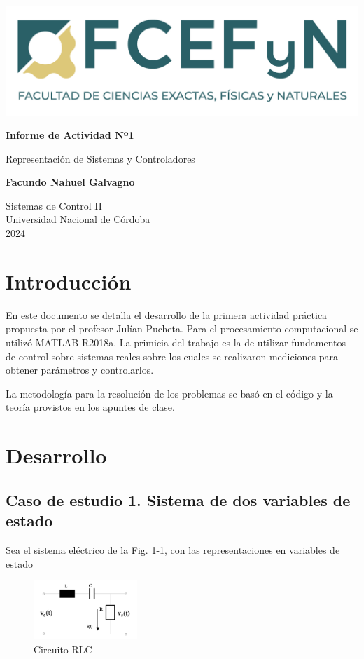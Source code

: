 \documentclass{article}
\renewcommand{\maketitle}{
    \begin{titlepage}
            \begin{center}
                \includegraphics[width=1\textwidth]{img/FCEFyN-Duotono_tagline.png}
            
            \vspace*{1cm}
                
            \Huge
            \textbf{Informe de Actividad Nº1}
                
            \vspace{0.5cm}
            \LARGE
            Representación de Sistemas y Controladores

                
            
                
            \vfill
                
            \textbf{Facundo Nahuel Galvagno}

            \vspace{0.8cm}
                
            
                
            \Large
            Sistemas de Control II\\
            Universidad Nacional de Córdoba \\
            2024
        \end{center}
                
    \end{titlepage}
}
\begin{document}

\maketitle

\tableofcontents
\newpage

\section{Introducción}
\label{section:1}
En este documento se detalla el desarrollo de la primera actividad
práctica propuesta por el profesor Julían Pucheta. Para el procesamiento 
computacional se utilizó MATLAB R2018a. La primicia del trabajo es la de utilizar fundamentos
de control sobre sistemas reales sobre los cuales se realizaron mediciones para obtener parámetros y
controlarlos.

La metodología para la resolución de los problemas se basó en el 
código y la teoría provistos en los apuntes de clase.

\section{Desarrollo}
\label{section:2}
\subsection{Caso de estudio 1. Sistema de dos variables de estado}
\label{subsection:1}
Sea el sistema eléctrico de la Fig. 1-1, con las representaciones en variables de estado

\begin{figure}[!h]
  \centering
  \includegraphics[width=0.35\textwidth]{img/1.png}
  \caption{Circuito RLC}
  \label{fig:1}
\end{figure}
\end{document}
